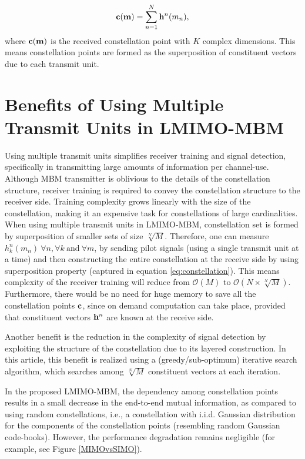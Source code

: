 \begin{equation}
\label{eq:constellation}
\rv{c}(\mathbf{m}) = \sum_{n = 1} ^ { N} \rmat{h}^n(m_n),
\end{equation}
where $\mathbf{c}(\mathbf{m})$ is the received constellation point with $K$ complex dimensions. This means constellation points are formed as the superposition of constituent vectors due to each transmit unit. 

\section {Benefits of Using Multiple Transmit Units in LMIMO-MBM}
\label{sec : Benefits}
Using multiple transmit units simplifies receiver training and signal detection, specifically in transmitting large amounts of information per channel-use. Although MBM transmitter is oblivious to the details of the constellation structure, receiver training is required to convey the constellation structure to the receiver side. Training complexity grows linearly with the size of the constellation, making it an expensive task for constellations of large cardinalities. When using multiple transmit units in LMIMO-MBM, constellation set is formed by superposition of smaller sets of size $ \sqrt[N]{M}$. Therefore, one can measure ${h}_{k}^n(m_n) \ \forall n, \forall k \ \text{and} \ \forall m $, by sending pilot signals (using a single transmit unit at a time) and then constructing the entire constellation at the receive side by using superposition property (captured in equation \eqref{eq:constellation}). This means complexity of the receiver training will reduce from $\mathcal{O}(M)$ to  $\mathcal{O}(N\times \sqrt[N]{ M})$. Furthermore, there would be no need for huge memory to save all the constellation points $\mathbf{c}$, since on demand computation can take place, provided that constituent vectors $\mathbf{h}^n$ are known at the receive side.

Another benefit is the reduction in the complexity of signal detection by exploiting the structure of the constellation due to its layered construction. In this article, this benefit is realized using a (greedy/sub-optimum) iterative search algorithm, which searches among $\sqrt[N]{M}$ constituent vectors at each iteration.

In the proposed LMIMO-MBM, the dependency among constellation points results in a small decrease in the end-to-end mutual information, as compared to using random constellations, i.e., a constellation with i.i.d. Gaussian distribution for the components of the constellation points (resembling random Gaussian code-books). However, the performance degradation remains negligible (for example, see Figure \ref{MIMOvsSIMO}). 

